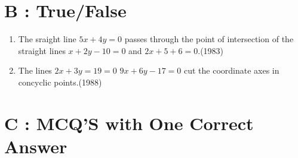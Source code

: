 \documentclass[12pt]{article}
\begin{document}
\section*{B    :    True/False}

\begin{enumerate}
		\fi
		\\
		True/False

\item  The sraight line $5x+4y=0$ passes through the point of intersection of the straight lines $x+2y-10=0$ and $2x+5+6=0$.(1983)\\
\item The lines $2x+3y=19=0$ $9x+6y-17=0$ cut the coordinate axes in concyclic points.(1988)\\
\iffalse
\end{enumerate}

\section*{C  :   MCQ'S with One Correct Answer}
\end{document}
